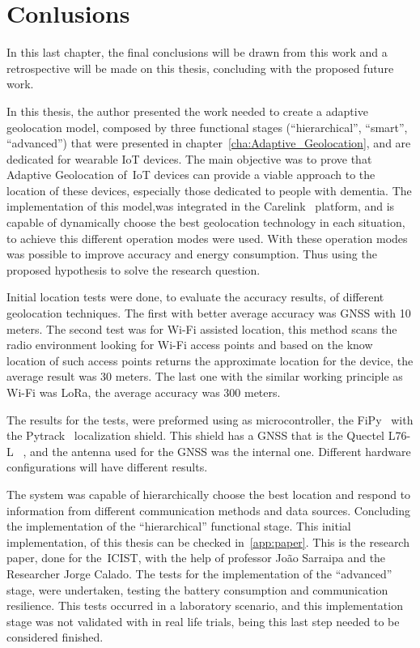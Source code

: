 \chapter{Conlusions}
\label{cha:Conlusions}

In this last chapter, the final conclusions will be drawn from this work and a retrospective will be made on this thesis,  concluding with the proposed future work.

In this thesis, the author presented the work needed to create a adaptive geolocation model, composed by three functional stages (“hierarchical”, “smart”, “advanced”) that were presented in chapter~\ref{cha:Adaptive_Geolocation}, and are dedicated for wearable IoT devices. The main objective was to prove that Adaptive Geolocation of~\gls{IoT} devices can provide a viable approach to the location of these devices, especially those dedicated to people with dementia. The implementation of this model,was integrated in the Carelink~\cite{carelink} platform, and is capable of dynamically choose the best geolocation technology in each situation, to achieve this different operation modes were used. With these operation modes was possible to improve accuracy and energy consumption. Thus using the proposed hypothesis to solve the research question. 


Initial location tests were done, to evaluate the accuracy results, of different geolocation techniques. The first with better average accuracy was GNSS with 10 meters. The second test was for Wi-Fi assisted location, this method scans the radio environment looking for Wi-Fi
access points and based on the know location of such access points returns the approximate location for the device, the average result was 30 meters. The last one with the similar working principle as Wi-Fi was LoRa, the average accuracy was 300 meters.

The results for the tests, were preformed using as microcontroller, the FiPy~\cite{Fipy} with the Pytrack~\cite{PytrackSpecs} localization shield. This shield has a GNSS that is the Quectel L76-L~\cite{quectelspecs} , and the antenna used for the GNSS
was the internal one. 
Different hardware configurations will have different results.

The system was capable of hierarchically choose the best location and respond to information from different communication methods and data sources. Concluding the implementation of the “hierarchical” functional stage.
This initial implementation, of this thesis can be checked in~\ref{app:paper}. This is the research paper, done for the~\gls{ICIST}, with the help of professor João Sarraipa and the Researcher Jorge Calado. The tests for the implementation of the “advanced” stage, were undertaken, testing the battery consumption and communication resilience. This tests occurred in a laboratory scenario, and this implementation stage was not validated with in real life trials, being this last step needed to be considered finished.

